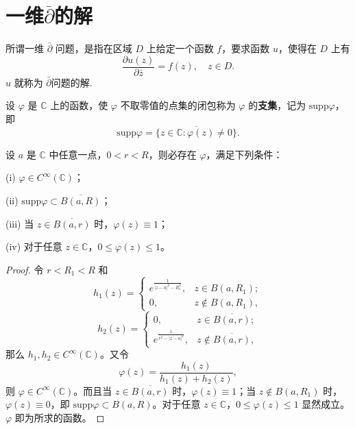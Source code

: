 \documentclass[../../main.tex]{subfiles}%
\begin{document}
\section{一维$\overline{\partial }$的解}

\begin{definition}
所谓一维 \( \bar{\partial} \) 问题，是指在区域 \( D \) 上给定一个函数 \( f \)，要求函数 \( u \)，使得在 \( D \) 上有
\[
\frac{\partial u(z)}{\partial \bar{z}} = f(z), \quad z \in D.
\]
\( u \) 就称为 \( \bar{\partial} \)问题的解.
\end{definition}

\begin{definition}
设 \( \varphi \) 是 \( \mathbb{C} \) 上的函数，使 \( \varphi \) 不取零值的点集的闭包称为 \( \varphi \) 的\textbf{支集}，记为 \( \text{supp}\varphi \)，即
\[
\text{supp}\varphi = \overline{\{ z \in \mathbb{C} : \varphi(z) \neq 0 \}}.
\]
\end{definition}

\begin{lemma}\label{lemma:引理3.7.2}
设 \( a \) 是 \( \mathbb{C} \) 中任意一点，\( 0 < r < R \)，则必存在 \( \varphi \)，满足下列条件：

(i) \( \varphi \in C^\infty(\mathbb{C}) \)；

(ii) \( \text{supp}\varphi \subset \overline{B(a,R)} \)；

(iii) 当 \( z \in \overline{B(a,r)} \) 时，\( \varphi(z) \equiv 1 \)；

(iv) 对于任意 \( z \in \mathbb{C} \)，\( 0 \leqslant \varphi(z) \leqslant 1 \)。
\end{lemma}
\begin{proof}
令 \( r < R_1 < R \) 和
\[
h_1(z) = \begin{cases} 
\displaystyle e^{\frac{1}{|z - a|^2 - R_1^2}}, & z \in B(a,R_1); \\
0, & z \notin B(a,R_1),
\end{cases}
\]
\[
h_2(z) = \begin{cases} 
0, & z \in \overline{B(a,r)}; \\
\displaystyle e^{\frac{1}{r^2 - |z - a|^2}}, & z \notin \overline{B(a,r)},
\end{cases}
\]
那么 \( h_1, h_2 \in C^\infty(\mathbb{C}) \)。又令
\[
\varphi(z) = \frac{h_1(z)}{h_1(z) + h_2(z)},
\]
则 \( \varphi \in C^\infty(\mathbb{C}) \)。而且当 \( z \in \overline{B(a,r)} \) 时，\( \varphi(z) \equiv 1 \)；当 \( z \notin B(a,R_1) \) 时，\( \varphi(z) \equiv 0 \)，即 \( \text{supp}\varphi \subset B(a,R) \)。对于任意 \( z \in \mathbb{C} \)，\( 0 \leqslant \varphi(z) \leqslant 1 \) 显然成立。\( \varphi \) 即为所求的函数。
\end{proof}
\end{document}
